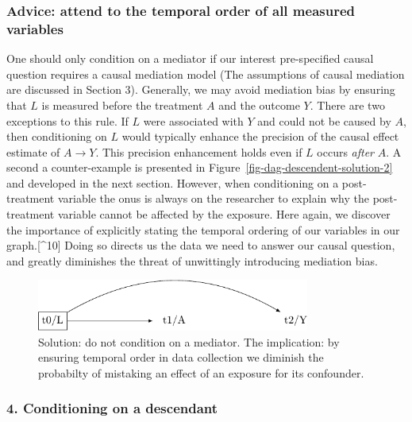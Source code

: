 \documentclass[
  singlecolumn,
  9pt]{article}
\begin{document}
\subsubsection{Advice: attend to the temporal order of all measured
variables}\label{advice-attend-to-the-temporal-order-of-all-measured-variables-1}

One should only condition on a mediator if our interest pre-specified
causal question requires a causal mediation model (The assumptions of
causal mediation are discussed in Section 3). Generally, we may avoid
mediation bias by ensuring that \(L\) is measured before the treatment
\(A\) and the outcome \(Y\). There are two exceptions to this rule. If
\(L\) were associated with \(Y\) and could not be caused by \(A\), then
conditioning on \(L\) would typically enhance the precision of the
causal effect estimate of \(A \to Y\). This precision enhancement holds
even if \(L\) occurs \emph{after} \(A\). A second a counter-example is
presented in Figure~\ref{fig-dag-descendent-solution-2} and developed in
the next section. However, when conditioning on a post-treatment
variable the onus is always on the researcher to explain why the
post-treatment variable cannot be affected by the exposure. Here again,
we discover the importance of explicitly stating the temporal ordering
of our variables in our graph.{[}\^{}10{]} Doing so directs us the data
we need to answer our causal question, and greatly diminishes the threat
of unwittingly introducing mediation bias.

\begin{figure}

{\centering \includegraphics[width=0.8\textwidth,height=\textheight]{causal-dags_files/figure-pdf/fig-dag-mediator-solution-1.pdf}

}

\caption{\label{fig-dag-mediator-solution}Solution: do not condition on
a mediator. The implication: by ensuring temporal order in data
collection we diminish the probabilty of mistaking an effect of an
exposure for its confounder.}

\end{figure}

\subsubsection{4. Conditioning on a
descendant}\label{conditioning-on-a-descendant}
\end{document}
